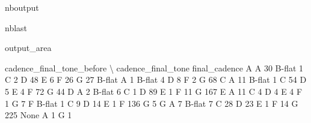 \documentclass[letterpaper,10pt,english]{sphinxmanual}
\begin{document}
\begin{sphinxuseclass}{nboutput}
\begin{sphinxuseclass}{nblast}
{\begin{sphinxuseclass}{output_area}
\begin{sphinxuseclass}{}
\begin{sphinxVerbatim}[commandchars=\\\{\}]
                                  cadence\_final\_tone\_before  \textbackslash{}
cadence\_final\_tone final\_cadence
A                  A                                     30
                   B-flat                                 1
                   C                                      2
                   D                                     48
                   E                                      6
                   F                                     26
                   G                                     27
B-flat             A                                      1
                   B-flat                                 4
                   D                                      8
                   F                                      2
                   G                                     68
C                  A                                     11
                   B-flat                                 1
                   C                                     54
                   D                                      5
                   E                                      4
                   F                                     72
                   G                                     44
D                  A                                      2
                   B-flat                                 6
                   C                                      1
                   D                                     89
                   E                                      1
                   F                                     11
                   G                                    167
E                  A                                     11
                   C                                      4
                   D                                      4
                   E                                      4
                   F                                      1
                   G                                      7
F                  B-flat                                 1
                   C                                      9
                   D                                     14
                   E                                      1
                   F                                    136
                   G                                      5
G                  A                                      7
                   B-flat                                 7
                   C                                     28
                   D                                     23
                   E                                      1
                   F                                     14
                   G                                    225
None               A                                      1
                   G                                      1


\end{sphinxVerbatim}
\end{sphinxuseclass}
\end{sphinxuseclass}}
\end{sphinxuseclass}
\end{sphinxuseclass}
\end{document}
